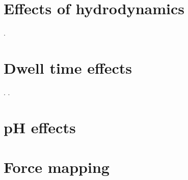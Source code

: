 





\section{Effects of hydrodynamics}

\newpage.
\newpage

\section{Dwell time effects}

\newpage.
\newpage.
\newpage

\section{pH effects}

\newpage
\newpage

\section{Force mapping}